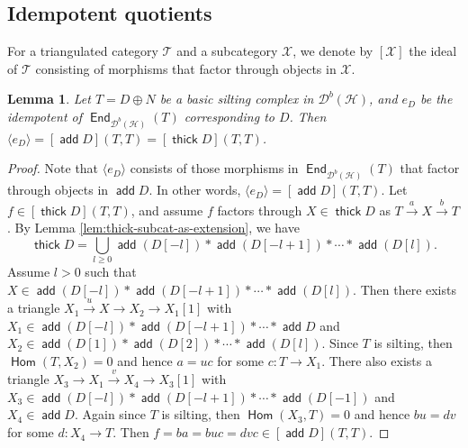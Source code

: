 \documentclass[12pt,a4paper,reqno]{amsart}
\newtheorem{lemma}[theorem]{Lemma}
\theoremstyle{definition}
\newcommand{\opname}[1]{\operatorname{\mathsf{#1}}}
\newcommand{\add}{\opname{add}\nolimits}
\newcommand{\der}{\cd}
\newcommand{\thick}{\opname{thick}}
\newcommand{\Hom}{\opname{Hom}}
\newcommand{\End}{\opname{End}}
\newcommand{\cd}{{\mathcal D}}
\newcommand{\xra}{\xrightarrow}
\begin{document}
\subsection{Idempotent quotients} For a triangulated category $\mathcal{T}$ and a subcategory $\mathcal{X}$, we denote by $[\mathcal{X}]$ the ideal of $\mathcal{T}$ consisting of morphisms that factor through objects in $\mathcal{X}$.

\begin{lemma}\label{l: ideal of idempotent}
Let $T = D\oplus N$ be a basic silting complex in $\der^b(\mathcal{H})$, and  $e_D$ be the idempotent of $\End_{\der^b(\mathcal{H})}(T)$ corresponding to $D$. Then $\langle e_D \rangle = [\add D](T, T) = [\thick D](T, T)$.
\end{lemma}
\begin{proof}
Note that $\langle e_D \rangle$ consists of those morphisms in $\End_{\der^b(\mathcal{H})}(T)$ that factor through objects in $\add D$. In other words, $\langle e_D \rangle = [\add D](T, T)$. Let $f \in [\thick D](T, T)$, and  assume $f$ factors through $X\in \thick D$ as $T \xra{a} X \xra{b} T$.  By Lemma \ref{lem:thick-subcat-as-extension}, we have
\[
\thick D = \bigcup\limits_{l \geq 0} \add (D[-l]) * \add (D[-l + 1]) * \cdots * \add (D[l]).
\]
Assume $l > 0$ such that $X \in \add (D[-l]) * \add (D[-l + 1]) * \cdots * \add (D[l])$. Then there exists a triangle $X_1 \xra{u} X \to X_2 \to X_1[1]$ with $X_1 \in \add (D[-l]) * \add (D[-l + 1]) * \cdots * \add D$ and $X_2 \in \add (D[1]) * \add (D[2]) * \cdots * \add (D[l])$. Since $T$ is silting, then $\Hom(T, X_2) = 0$ and hence $a = uc$ for some $c : T \to X_1$. There also exists a triangle $X_3 \to X_1 \xra{v} X_4 \to X_3[1]$ with $X_3 \in \add (D[-l]) * \add (D[-l + 1]) * \cdots * \add (D[-1])$ and $X_4 \in \add D$. Again since $T$ is silting, then $\Hom(X_3, T) = 0$ and hence $bu = dv$ for some $d : X_4 \to T$. Then $f = ba = buc = dvc \in [\add D](T, T)$.
\end{proof}
\end{document}
